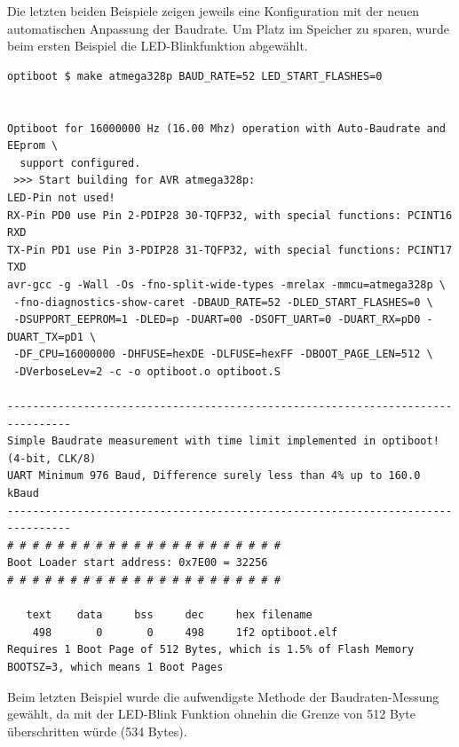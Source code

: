 Die letzten beiden Beispiele zeigen jeweils eine Konfiguration mit der neuen automatischen Anpassung der Baudrate.
Um Platz im Speicher zu sparen, wurde beim ersten Beispiel die LED-Blinkfunktion abgewählt.

\begin{verbatim}
optiboot $ make atmega328p BAUD_RATE=52 LED_START_FLASHES=0


Optiboot for 16000000 Hz (16.00 Mhz) operation with Auto-Baudrate and EEprom \
  support configured.
 >>> Start building for AVR atmega328p:
LED-Pin not used!
RX-Pin PD0 use Pin 2-PDIP28 30-TQFP32, with special functions: PCINT16 RXD
TX-Pin PD1 use Pin 3-PDIP28 31-TQFP32, with special functions: PCINT17 TXD
avr-gcc -g -Wall -Os -fno-split-wide-types -mrelax -mmcu=atmega328p \
 -fno-diagnostics-show-caret -DBAUD_RATE=52 -DLED_START_FLASHES=0 \
 -DSUPPORT_EEPROM=1 -DLED=p -DUART=00 -DSOFT_UART=0 -DUART_RX=pD0 -DUART_TX=pD1 \
 -DF_CPU=16000000 -DHFUSE=hexDE -DLFUSE=hexFF -DBOOT_PAGE_LEN=512 \
 -DVerboseLev=2 -c -o optiboot.o optiboot.S

--------------------------------------------------------------------------------
Simple Baudrate measurement with time limit implemented in optiboot! (4-bit, CLK/8)
UART Minimum 976 Baud, Difference surely less than 4% up to 160.0 kBaud
--------------------------------------------------------------------------------
# # # # # # # # # # # # # # # # # # # # # #
Boot Loader start address: 0x7E00 = 32256
# # # # # # # # # # # # # # # # # # # # # #

   text	   data	    bss	    dec	    hex	filename
    498	      0	      0	    498	    1f2	optiboot.elf
Requires 1 Boot Page of 512 Bytes, which is 1.5% of Flash Memory
BOOTSZ=3, which means 1 Boot Pages

\end{verbatim}

Beim letzten Beispiel wurde die aufwendigste Methode der Baudraten-Messung
gewählt, da mit der LED-Blink Funktion ohnehin die Grenze von 512 Byte
überschritten würde (534 Bytes).

